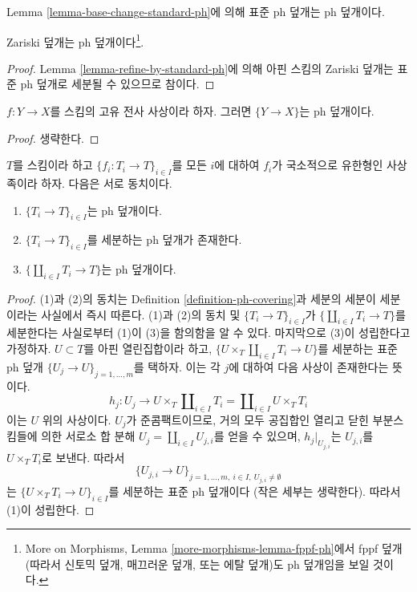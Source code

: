 \noindent
Lemma \ref{lemma-base-change-standard-ph}에 의해 표준 ph 덮개는 ph
덮개이다.

\begin{lemma}
\label{lemma-zariski-ph}
Zariski 덮개는 ph 덮개이다\footnote{More on Morphisms, Lemma
\ref{more-morphisms-lemma-fppf-ph}에서 fppf 덮개(따라서 신토믹 덮개,
매끄러운 덮개, 또는 에탈 덮개)도 ph 덮개임을 보일 것이다.}.
\end{lemma}

\begin{proof}
Lemma \ref{lemma-refine-by-standard-ph}에 의해 아핀 스킴의 Zariski
덮개는 표준 ph 덮개로 세분될 수 있으므로 참이다.
\end{proof}

\begin{lemma}
\label{lemma-surjective-proper-ph}
$f : Y \to X$를 스킴의 고유 전사 사상이라 하자. 그러면
$\{Y \to X\}$는 ph 덮개이다.
\end{lemma}

\begin{proof}
생략한다.
\end{proof}

\begin{lemma}
\label{lemma-refine-by-ph}
$T$를 스킴이라 하고 $\{f_i : T_i \to T\}_{i \in I}$를 모든 $i$에
대하여 $f_i$가 국소적으로 유한형인 사상족이라 하자. 다음은 서로
동치이다.
\begin{enumerate}
\item $\{T_i \to T\}_{i \in I}$는 ph 덮개이다.
\item $\{T_i \to T\}_{i \in I}$를 세분하는 ph 덮개가 존재한다.
\item $\{\coprod_{i \in I} T_i \to T\}$는 ph 덮개이다.
\end{enumerate}
\end{lemma}

\begin{proof}
(1)과 (2)의 동치는 Definition \ref{definition-ph-covering}과 세분의
세분이 세분이라는 사실에서 즉시 따른다. (1)과 (2)의 동치 및
$\{T_i \to T\}_{i \in I}$가 $\{\coprod_{i \in I} T_i \to T\}$를
세분한다는 사실로부터 (1)이 (3)을 함의함을 알 수 있다. 마지막으로
(3)이 성립한다고 가정하자. $U \subset T$를 아핀 열린집합이라 하고,
$\{U \times_T \coprod_{i \in I} T_i \to U\}$를 세분하는 표준 ph 덮개
$\{U_j \to U\}_{j = 1, \ldots, m}$를 택하자. 이는 각 $j$에 대하여
다음 사상이 존재한다는 뜻이다.
$$
h_j :
U_j
\longrightarrow
U \times_T \coprod\nolimits_{i \in I} T_i =
\coprod\nolimits_{i \in I} U \times_T T_i
$$
이는 $U$ 위의 사상이다. $U_j$가 준콤팩트이므로, 거의 모두 공집합인
열리고 닫힌 부분스킴들에 의한 서로소 합 분해
$U_j = \coprod_{i \in I} U_{j, i}$를 얻을 수 있으며,
$h_j|_{U_{j, i}}$는 $U_{j, i}$를 $U \times_T T_i$로 보낸다. 따라서
$$
\{U_{j, i} \to U\}_{j = 1, \ldots, m,\ i \in I,\ U_{j, i} \not = \emptyset}
$$
는 $\{U \times_T T_i \to U\}_{i \in I}$를 세분하는 표준 ph 덮개이다
(작은 세부는 생략한다). 따라서 (1)이 성립한다.
\end{proof}

